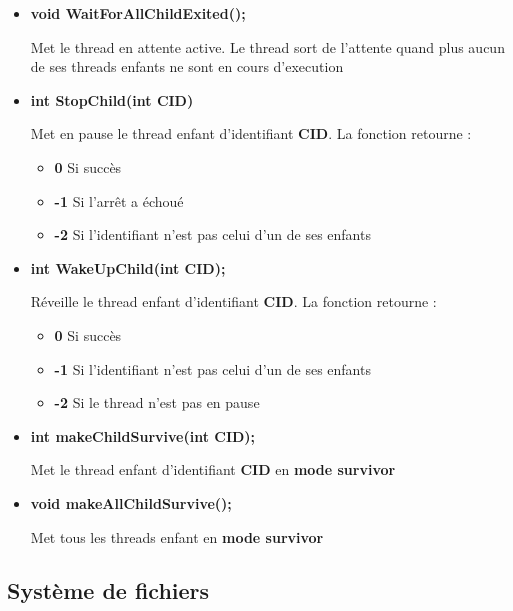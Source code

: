 \documentclass{article}
\begin{document}
\begin{itemize}
  \item 
  \textbf{void WaitForAllChildExited();}
  
  Met le thread en attente active. Le thread sort de l'attente quand plus aucun de ses threads enfants ne sont en cours d'execution
  
  \item 
  \textbf{int StopChild(int CID)}
  
  Met en pause le thread enfant d'identifiant \textbf{CID}. 
  La fonction retourne :    
    \begin{itemize}
      \item \textbf{0} Si succès
      \item \textbf{-1} Si l'arrêt a échoué
      \item \textbf{-2} Si l'identifiant n'est pas celui d'un de ses enfants
    \end{itemize}       
    
  
  \item 
  \textbf{int WakeUpChild(int CID);}
  
    
  Réveille le thread enfant d'identifiant \textbf{CID}. 
  La fonction retourne :    
    \begin{itemize}
      \item \textbf{0} Si succès
      \item \textbf{-1} Si l'identifiant n'est pas celui d'un de ses enfants
      \item \textbf{-2} Si le thread n'est pas en pause
    \end{itemize} 
  
  \item 
  \textbf{int makeChildSurvive(int CID);}
  
  Met le thread enfant d'identifiant \textbf{CID} en \textbf{mode survivor}
  
  \item 
  \textbf{void makeAllChildSurvive();}
  
  Met tous les threads enfant en \textbf{mode survivor}
\end{itemize}

\subsection{Système de fichiers}
\end{document}
